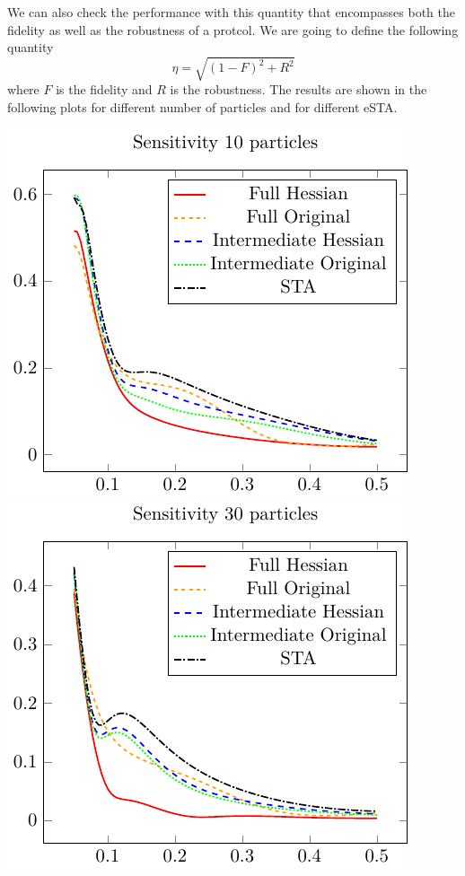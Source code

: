 We can also check the performance with this quantity that encompasses both the fidelity as well as the robustness of a protcol.
We are going to define the following quantity
\begin{equation}
	\eta = \sqrt{(1-F)^{2} + R^{2}}
	\label{eq:Sensitivity}
\end{equation}
where $F$ is the fidelity and $ R $  is the robustness.
The results are shown in the following plots for different number of particles and for different eSTA.

\includegraphics{./gfx/sensitivity_np10_nlambda5.pdf}
\includegraphics{./gfx/sensitivity_np30_nlambda5.pdf}

